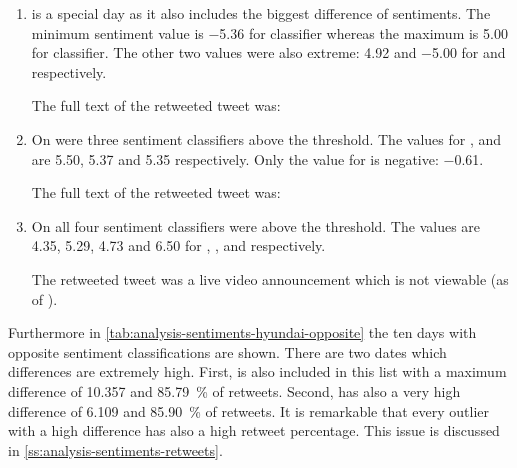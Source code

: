 \begin{enumerate}
    \item 
         is a special day as it also includes the biggest difference of sentiments.
        The minimum sentiment value is \num{-5.36} for \nb{} classifier whereas the maximum is \num{5.00} for \me{} classifier.
        The other two values were also extreme: \num{4.92} and \num{-5.00} for \tb{} and \svm{} respectively.


        The full text of the retweeted tweet was:

    \item
        On  were three sentiment classifiers above the threshold.
        The values for \tb{}, \nb{} and \me{} are \num{5.50}, \num{5.37} and \num{5.35} respectively.
        Only the value for \svm{} is negative: \num{-0.61}.


        The full text of the retweeted tweet was:

    \item
        On  all four sentiment classifiers were above the threshold.
        The values are \num{4.35}, \num{5.29}, \num{4.73} and \num{6.50} for \ftb{}, \fnb{}, \fme{} and \fsvm{} respectively.

        The retweeted tweet was a live video announcement which is not viewable (as of ).
\end{enumerate}

\begin{figure}[hbt]
    \centering
    
    \caption{\sentimentsCaption{\hyundai}}
    \label{fig:analysis-sentiments-hyundai}
\end{figure} 

Furthermore in \cref{tab:analysis-sentiments-hyundai-opposite} the ten days with opposite sentiment classifications are shown.
There are two dates which differences are extremely high.
First,  is also included in this list with a maximum difference of \num{10.357} and \SI{85.79}{\percent} of retweets.
Second,  has also a very high difference of \num{6.109} and \SI{85.90}{\percent} of retweets.
It is remarkable that every outlier with a high difference has also a high retweet percentage.
This issue is discussed in \cref{ss:analysis-sentiments-retweets}.

